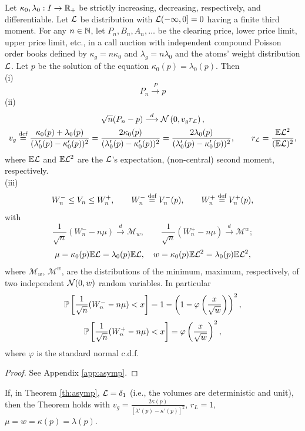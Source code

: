 \documentclass{aptpub}
\begin{document}
\begin{theorem} \label{th:asymp} Let $\kappa_0,\lambda_0:I\rightarrow \R_+$ be strictly increasing, decreasing, respectively, and differentiable. Let $\L$ be distribution with $\L(-\infty,0]=0$ having a finite third moment. For any $n \in \N$, let $P_n,B_n,A_n,\dots$ be the clearing price, lower price limit, upper price limit, etc., in a call auction with independent compound Poisson order books defined by $\kappa_g = n \kappa_0$ and $\lambda_g = n\lambda_0$ and the atoms' weight distribution $\L$. Let $p$ be the solution of the equation $\kappa_0(p)= \lambda_0(p)$. Then\\
(i) $$P_n\stackrel{P}\longrightarrow p$$
(ii)
\begin{multline*}
\sqrt{n}(P_n-p) \stackrel{d} \longrightarrow \ND\left(0,v_gr_\L\right), 
\\ 
v_g \defined \frac{\kappa_0(p)+\lambda_0(p)}{(\lambda_0'(p)-\kappa_0'(p))^2}=\frac{2\kappa_0(p)}{(\lambda_0'(p)-\kappa_0'(p))^2}
=
\frac{2\lambda_0(p)}{(\lambda_0'(p)-\kappa_0'(p))^2},
\qquad
r_\L = \frac{\E \L^2}{(\E \L)^2},
\end{multline*}
where  $\E\L$ and $\E\L^2$ are the $\L$'s expectation, (non-central) second moment, respectively.\\
(iii) 
$$W^-_n \leq V_n \leq W^+_n,\qquad 
W^-_n \defined V_n^-(p),\qquad W_n^+ \defined V_n^+(p),$$
with
$$
\frac{1}{\sqrt{n}}(W_n^--n \mu)\stackrel{d}\longrightarrow \mathcal{M}_{w}, 
\qquad 
\frac{1}{\sqrt{n}}(W_n^+-n \mu)\stackrel{d}\longrightarrow \mathcal{M}^{w};
$$
$$
\mu = \kappa_0(p) \E\L = \lambda_0(p) \E\L, \quad
w = 
\kappa_0(p) \E \L^2= \lambda_0(p) \E \L^2,
$$
where $\mathcal{M}_w$, $\mathcal{M}^w$, are the distributions of the minimum, maximum, respectively, of two independent $\ND(0,w)$ random variables. In particular
$$
\P\left[ \frac{1}{\sqrt{n}}(W^-_n-n \mu)  < x
\right] = 1-\left(1-\varphi\left(\frac{x}{\sqrt{w}}\right) \right)^2,
$$
$$
\P\left[ \frac{1}{\sqrt{n}}(W^+_n-n \mu) < x
\right] = \varphi\left(\frac{x}{\sqrt{w}}\right)^2,
$$
where $\varphi$ is the standard normal c.d.f.
\end{theorem}

\begin{proof} See Appendix \ref{app:asymp}.
\end{proof}


\begin{corollary}
If, in Theorem \ref{th:asymp}, $\L = \delta_1$ (i.e., the volumes are deterministic and unit), then the Theorem holds with 
$v_g = \frac{2\kappa(p)}{[\lambda'(p)-\kappa'(p)]^2}$, $r_L=1$, $\mu = w = \kappa(p)=\lambda(p)$.
\end{corollary}
\end{document}
